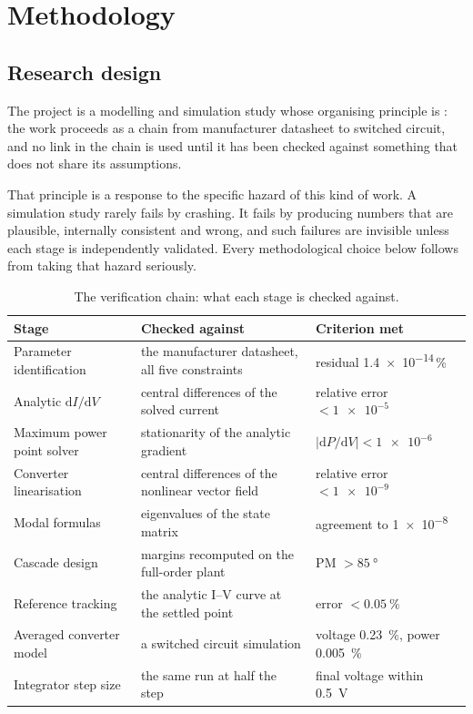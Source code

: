 \chapter{Methodology}
\label{ch:method}

\section{Research design}

The project is a modelling and simulation study whose organising principle is
: the work proceeds as a chain from manufacturer
datasheet to switched circuit, and no link in the chain is used until it has
been checked against something that does not share its assumptions.

That principle is a response to the specific hazard of this kind of work. A
simulation study rarely fails by crashing. It fails by producing numbers that
are plausible, internally consistent and wrong, and such failures are invisible
unless each stage is independently validated. Every methodological choice below
follows from taking that hazard seriously.

\begin{table}[htbp]
\centering
\caption{The verification chain: what each stage is checked against.}
\label{tab:verifychain}
\begin{tabular}{@{}L{0.27\textwidth}L{0.34\textwidth}L{0.29\textwidth}@{}}
\toprule
\textbf{Stage} & \textbf{Checked against} & \textbf{Criterion met} \\
\midrule
Parameter identification & the manufacturer datasheet, all five constraints & residual \num{1.4e-14}\,\si{\percent} \\
Analytic $\mathrm{d}I/\mathrm{d}V$ & central differences of the solved current & relative error $<\num{1e-5}$ \\
Maximum power point solver & stationarity of the analytic gradient & $|\mathrm{d}P/\mathrm{d}V| < \num{1e-6}$ \\
Converter linearisation & central differences of the nonlinear vector field & relative error $<\num{1e-9}$ \\
Modal formulas & eigenvalues of the state matrix & agreement to \num{1e-8} \\
Cascade design & margins recomputed on the full-order plant & PM $>\SI{85}{\degree}$ \\
Reference tracking & the analytic I--V curve at the settled point & error $<\SI{0.05}{\percent}$ \\
Averaged converter model & a switched circuit simulation & voltage \SI{0.23}{\percent}, power \SI{0.005}{\percent} \\
Integrator step size & the same run at half the step & final voltage within \SI{0.5}{\volt} \\
\bottomrule
\end{tabular}
\end{table}

